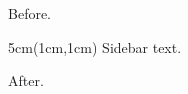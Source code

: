 \documentclass{article}
\begin{document}
Before.
\begin{textblock*}{5cm}(1cm,1cm)
Sidebar text.
\end{textblock*}
After.
\end{document}
